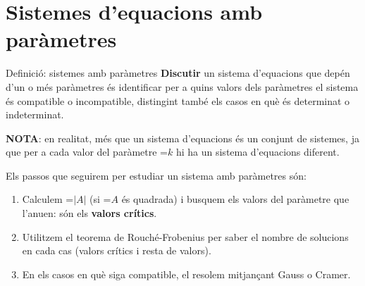 \documentclass[11pt,a4paper]{article}
\newcommand{\fmm}[1]{\setbox0=\hbox{$#1$}\ifdim\wd0>\linewidth\fmdisp{#1}\else\mbox{\box0}\fi}
\newcommand{\fmdisp}[1]{\[\setbox2=\hbox{$\displaystyle #1$}\ifdim\wd2>\linewidth\resizebox{\linewidth}{!}{\box2}\else\box2\fi\]}
\newcommand{\fmuline}[1]{\textbf{\color{fmaccent}#1}}
\begin{document}
\section{Sistemes d'equacions amb paràmetres}\hypertarget{sec6}{}

\begin{fmdef}{Definició: sistemes amb paràmetres}
\textbf{Discutir} un sistema d'equacions que depén d'un o més paràmetres és identificar per a quins valors dels paràmetres el sistema és compatible o incompatible, distingint també els casos en què és determinat o indeterminat.

\begin{fmnote}\fmuline{NOTA}: en realitat, més que un sistema d'equacions és un conjunt de sistemes, ja que per a cada valor del paràmetre \fmm{k} hi ha un sistema d'equacions diferent.\end{fmnote}

Els passos que seguirem per estudiar un sistema amb paràmetres són:

\begin{enumerate}
\item Calculem \fmm{|A|} (si \fmm{A} és quadrada) i busquem els valors del paràmetre que l'anu\lgem{}en: són els \textbf{valors crítics}.
\item Utilitzem el teorema de Rouché-Frobenius per saber el nombre de solucions en cada cas (valors crítics i resta de valors).
\item En els casos en què siga compatible, el resolem mitjançant Gauss o Cramer.
\end{enumerate}
\end{fmdef}
\end{document}
